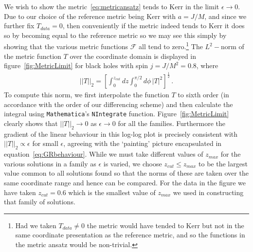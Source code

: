 \documentclass[12pt]{article}
\numberwithin{equation}{section}
\begin{document}
We wish to show the metric~\eqref{eq:metricansatz} tends to Kerr in the limit $\epsilon \to 0$.
Due to our choice of the reference metric being Kerr with $a = J/M$, and since we further fix $T_{data} = 0$, then conveniently if the metric indeed tends to Kerr it does so by becoming equal to the reference metric so we may see this simply by showing that the various metric functions $\mathcal{F}$ all tend to zero.\footnote{Had we taken $T_{data} \ne 0$ the metric would have tended to Kerr but not in the same coordinate presentation as the reference metric, and so the functions in the metric ansatz would be non-trivial.}
The $L^2-$norm of the metric function $T$ over the coordinate domain is displayed in figure~\ref{fig:MetricLimit} for black holes with spin $j = J/M^2 = 0.8$, where
\begin{eqnarray}
|| T ||_2= \left[ \int_0^{z_{cut}} dz \int_0^{\pi/2} d\phi\, | T |^2\right]^{\frac{1}{2}}\,.
\end{eqnarray}
To compute this norm, we first interpolate the function
$T$ 
to sixth order (in accordance with the order of our differencing scheme) and then calculate the integral using {\tt Mathematica}'s {\tt NIntegrate} function.
Figure~\ref{fig:MetricLimit} clearly shows that $||T||_2\to 0$ as $\epsilon \to 0$ for all the families.
Furthermore the gradient of the linear behaviour in this log-log plot is precisely consistent with $|| T ||_2 \propto \epsilon$ for small $\epsilon$, agreeing with the `painting' picture encapsulated in equation~\eqref{eq:GRbehaviour}.
While we must take different values of $z_{max}$ for the various solutions in a family as $\epsilon$ is varied, we choose $z_{cut} \le z_{max}$ to be the largest value common to all solutions found so that the norms of these are taken over the same coordinate range and hence can be compared. For the data in the figure we have taken $z_{cut} = 0.6$ which is the smallest value of $z_{max}$ we used in constructing that family of solutions.
\end{document}
